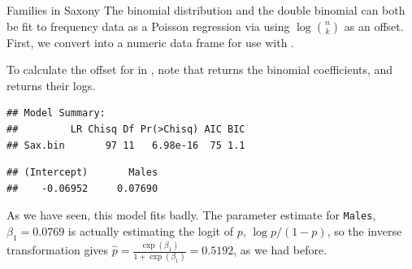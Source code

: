 \documentclass[11pt]{book}
\renewenvironment{knitrout}{\small\renewcommand{\baselinestretch}{.85}}{} %
\begin{document}
\begin{Example}[saxony2]{Families in Saxony}
The binomial distribution and the double binomial can both be fit to frequency data as a Poisson regression via 
using $\log \binom{n}{k}$ as an offset. 
First, we convert  into a numeric data frame for use with .
\begin{knitrout}
\color{fgcolor}\begin{kframe}
\begin{alltt}
 \hlstd{=}\hlstd{)}
 \hlkwb{<-} \hlstd{(}
 \hlkwb{<-} 
 \hlkwb{<-} 
\end{alltt}
\end{kframe}
\end{knitrout}
To calculate the offset  for  in \R, 
note that  returns the
binomial coefficients, and  returns their logs.
\begin{knitrout}
\color{fgcolor}\begin{kframe}
\begin{alltt}
 \hlkwb{<-}  \hlopt{~}  \hlstd{=}\hlstd{(}\hlstd{,}\hlopt{:}\hlstd{),}
                

\end{alltt}
\begin{verbatim}
## Model Summary:
##         LR Chisq Df Pr(>Chisq) AIC BIC
## Sax.bin       97 11   6.98e-16  75 1.1
\end{verbatim}
\begin{alltt}
\end{alltt}
\begin{verbatim}
## (Intercept)       Males 
##    -0.06952     0.07690
\end{verbatim}
\end{kframe}
\end{knitrout}
As we have seen, this model fits badly.  
The parameter estimate for \texttt{Males}, $\beta_1 = 0.0769$
is actually estimating the logit of $p$, $\log p / (1-p)$,
so the inverse transformation gives
$\hat{p} = \frac{\exp (\beta_1)}{1 + \exp (\beta_1)} = 0.5192$,
as we had before.



\end{Example}
\end{document}
